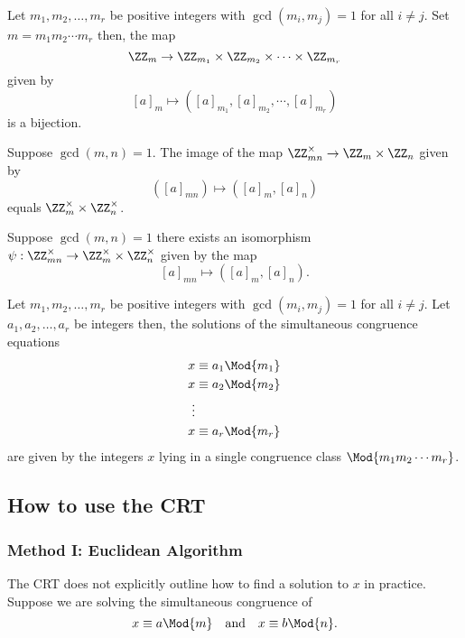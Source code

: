 \documentclass[12pt, a4paper]{article}
\begin{document}
\begin{theorem}
    Let \(m_1,m_2,\ldots,m_r\) be positive integers with \(\gcd(m_i,m_j)=1\) for all \(i\neq j\). Set \(m=m_1m_2\cdots m_r\) then, the map 
    \[\ZZ_m \to \ZZ_{m_1} \times \ZZ_{m_2} \times \cdots \times \ZZ_{m_r}\] 
    given by 
    \[[a]_m \mapsto \left( [a]_{m_1}, [a]_{m_2}, \cdots, [a]_{m_r}  \right)\]
    is a bijection.
\end{theorem}

\begin{mdprop}
    Suppose \(\gcd(m,n)=1.\) The image of the map \(\ZZ_{mn}^{\times} \to \ZZ_m \times \ZZ_n\) given by
    \[([a]_{mn}) \mapsto ([a]_m,[a]_n)\] 
    equals \(\ZZ_m^{\times} \times \ZZ_n^{\times}\).
\end{mdprop}

\begin{mdnote}
    Suppose \(\gcd(m,n)=1\) there exists an isomorphism \(\psi : \ZZ_{mn}^{\times} \to \ZZ_m^{\times} \times \ZZ_n^{\times}\) given by the map 
    \[[a]_{mn} \mapsto \left( [a]_m,[a]_n \right).\]
\end{mdnote}

\begin{mdthm}
    Let \(m_1,m_2,\ldots,m_r\) be positive integers with \(\gcd(m_i,m_j)=1\) for all \(i\neq j\). Let \(a_1,a_2,\ldots,a_r\) be integers then, the solutions of the simultaneous congruence equations 
    \[\begin{aligned}
        x&\equiv a_1 \Mod{m_1}\\
        x&\equiv a_2 \Mod{m_2}\\
        \vdots \\
        x&\equiv a_r \Mod{m_r}\\
    \end{aligned}\]
    are given by the integers \(x\) lying in a single congruence class \(\Mod{m_1m_2\cdots m_r}\).
\end{mdthm}

\subsection{How to use the CRT}


\subsubsection{Method I: Euclidean Algorithm}

The CRT does not explicitly outline how to find a solution to \(x\) in practice. Suppose we are solving the simultaneous congruence of 
\[x \equiv a \Mod{m} \quad \text{and} \quad x\equiv b \Mod{n}.\]
\end{document}
